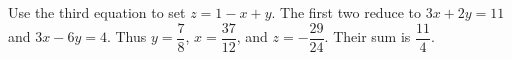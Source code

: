 Use the third equation to set $z=1-x+y$. The first two reduce to $3x+2y=11$ and $3x-6y=4$. Thus $y=\dfrac{7}{8}$, $x=\dfrac{37}{12}$, and $z=-\dfrac{29}{24}$. Their sum is $\boxed{\dfrac{11}{4}}$.
